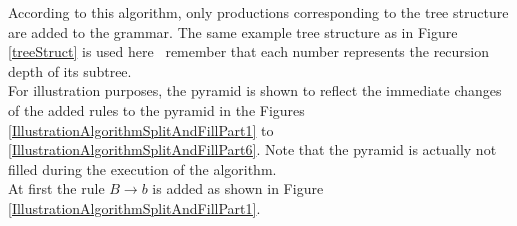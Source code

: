 \begin{testexample}
	According to this algorithm, only productions corresponding to the tree structure are added to the grammar. The same example tree structure as in Figure \ref{treeStruct} is used here \textendash~remember that each number represents the recursion depth of its subtree.\\ For illustration purposes, the pyramid is shown to reflect the immediate changes of the added rules to the pyramid in the Figures \ref{IllustrationAlgorithmSplitAndFillPart1} to \ref{IllustrationAlgorithmSplitAndFillPart6}. Note that the pyramid is actually not filled during the execution of the algorithm.\\	
	
	\noindent At first the rule $B\rightarrow b$ is added as shown in Figure \ref{IllustrationAlgorithmSplitAndFillPart1}.\\
	\pagebreak
	

\end{testexample}
